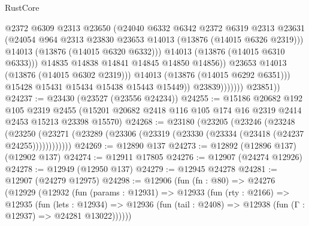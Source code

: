 \begin{lexlean}{RustCore}
\begin{coremodule}
                                    @2372
                                    @6309
                                    @2313
                                    @23650
                                    (@24040
                                      @6332
                                      @6342
                                      @2372
                                      @6319
                                      @2313
                                      @23631
                                      (@24054
                                        @964
                                        @2313
                                        @23830
                                        @23653
                                        @14013
                                        (@13876 (@14015 @6326 @2319)))
                                      @14013
                                      (@13876 (@14015 @6320 @6332)))
                                    @14013
                                    (@13876 (@14015 @6310 @6333)))
                                  @14835
                                  @14838
                                  @14841
                                  @14845
                                  @14850
                                  @14856))
                              @23653
                              @14013
                              (@13876 (@14015 @6302 @2319)))
                            @14013
                            (@13876 (@14015 @6292 @6351)))
                          @15428
                          @15431
                          @15434
                          @15438
                          @15443
                          @15449))
                      @23839)))))))
        @23851))
@24237 := @23430 (@23527 (@23556 @24234))
@24255 := @15186
    @20682
    @192
    @105
    @2319
    @2455
    (@15201 @20682 @2418 @116 @105 @174 @16 @2319 @2414 @2453 @15213 @23398 @15570)
@24268 := @23180
    (@23205
      (@23246
        (@23248
          (@23250 (@23271 (@23289 (@23306 (@23319 (@23330 (@23334 (@23418 (@24237 @24255))))))))))))
@24269 := @12890 @137
@24273 := @12892 (@12896 @137) (@12902 @137)
@24274 := @12911 @17805
@24276 := @12907 (@24274 @12926)
@24278 := @12949 (@12950 @137)
@24279 := @12945 @24278
@24281 := @12907 (@24279 @12975)
@24298 := @12906
    (fun (fn : @80) =>
    @24276
      (@12929
        (@12932
          (fun (params : @12931) =>
          @12933
            (fun (rty : @2166) =>
            @12935
              (fun (lets : @12934) =>
              @12936 (fun (tail : @2408) => @12938 (fun (Γ : @12937) => @24281 @13022))))))

\end{coremodule}
\end{lexlean}
